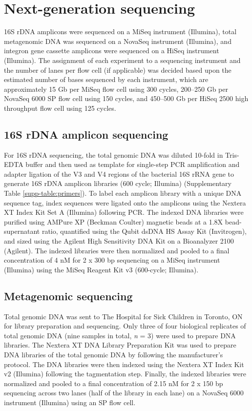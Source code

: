 \section{Next-generation sequencing}

16S rDNA amplicons were sequenced on a MiSeq instrument (Illumina), total metagenomic DNA was sequenced on a NovaSeq instrument (Illumina), and integron gene cassette amplicons were sequenced on a HiSeq instrument (Illumina).
The assignment of each experiment to a sequencing instrument and the number of lanes per flow cell (if applicable) was decided based upon the estimated number of bases sequenced by each instrument, which are approximately 15 Gb per MiSeq flow cell using 300 cycles, 200--250 Gb per NovaSeq 6000 SP flow cell using 150 cycles, and 450--500 Gb per HiSeq 2500 high throughput flow cell using 125 cycles.

\subsection{16S rDNA amplicon sequencing} \label{section:methods-16S}

For 16S rDNA sequencing, the total genomic DNA was diluted 10-fold in Tris-EDTA buffer and then used as template for single-step PCR amplification and adapter ligation of the V3 and V4 regions of the bacterial 16S rRNA gene to generate 16S rDNA amplicon libraries (600 cycle; Illumina) (Supplementary Table \ref{supp-table:primers}).
To label each amplicon library with a unique DNA sequence tag, index sequences were ligated onto the amplicons using the Nextera\textsuperscript{\textregistered{}} XT Index Kit Set A (Illumina) following PCR.
The indexed DNA libraries were purified using AMPure XP (Beckman Coulter) magnetic beads at a 1.8X bead-supernatant ratio, quantified using the Qubit\textsuperscript{\texttrademark{}} dsDNA HS Assay Kit (Invitrogen), and sized using the Agilent High Sensitivity DNA Kit on a Bioanalyzer 2100 (Agilent).
The indexed libraries were then normalized and pooled to a final concentration of 4 nM for 2 x 300 bp sequencing on a MiSeq instrument (Illumina) using the MiSeq Reagent Kit v3 (600-cycle; Illumina).

\subsection{Metagenomic sequencing}

Total genomic DNA was sent to The Hospital for Sick Children in Toronto, ON for library preparation and sequencing.
Only three of four biological replicates of total genomic DNA (nine samples in total, \textit{n} = 3) were used to prepare DNA libraries.
The Nextera\textsuperscript{\textregistered{}} XT DNA Library Preparation Kit was used to prepare DNA libraries of the total genomic DNA by following the manufacturer’s protocol.
The DNA libraries were then indexed using the Nextera\textsuperscript{\textregistered{}} XT Index Kit v2 (Illumina) following the tagmentation step.
Finally, the indexed libraries were normalized and pooled to a final concentration of 2.15 nM for 2 x 150 bp sequencing across two lanes (half of the library in each lane) on a NovaSeq 6000 instrument (Illumina) using an SP flow cell.

